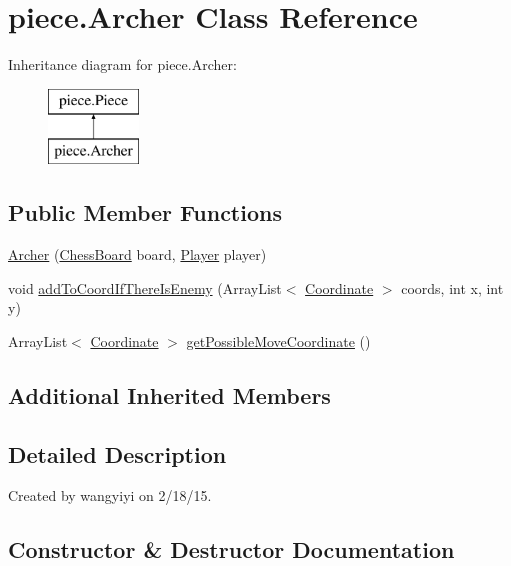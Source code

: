 \hypertarget{classpiece_1_1_archer}{}\section{piece.\+Archer Class Reference}
\label{classpiece_1_1_archer}
Inheritance diagram for piece.\+Archer\+:\begin{figure}[H]
\begin{center}
\leavevmode
\includegraphics[height=2.000000cm]{classpiece_1_1_archer}
\end{center}
\end{figure}
\subsection*{Public Member Functions}
\begin{DoxyCompactItemize}
\item 
\hyperlink{classpiece_1_1_archer_a0a99d10d9c827a180e8743ec10489344}{Archer} (\hyperlink{classchessboard_1_1_chess_board}{Chess\+Board} board, \hyperlink{enumchessboard_1_1_player}{Player} player)
\item 
void \hyperlink{classpiece_1_1_archer_ae536059b2403dfe1ca315b8166d90c45}{add\+To\+Coord\+If\+There\+Is\+Enemy} (Array\+List$<$ \hyperlink{classpiece_1_1_coordinate}{Coordinate} $>$ coords, int x, int y)
\item 
Array\+List$<$ \hyperlink{classpiece_1_1_coordinate}{Coordinate} $>$ \hyperlink{classpiece_1_1_archer_afaddadc53c41508da32f6c14e5e57317}{get\+Possible\+Move\+Coordinate} ()
\end{DoxyCompactItemize}
\subsection*{Additional Inherited Members}


\subsection{Detailed Description}
Created by wangyiyi on 2/18/15. 

\subsection{Constructor \& Destructor Documentation}
\hypertarget{classpiece_1_1_archer_a0a99d10d9c827a180e8743ec10489344}{}
